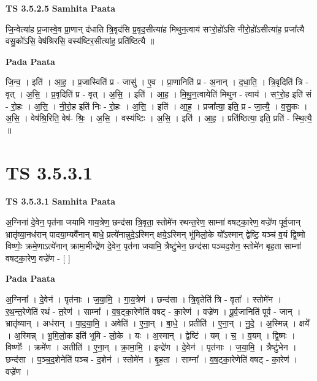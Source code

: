 \documentclass[17pt]{extarticle}
\begin{document}
\textbf{TS 3.5.2.5 } \newline
\textbf{Samhita Paata} \newline

जि॒न्वेत्या॑ह प्र॒जास्वे॒व प्रा॒णान् द॑धाति त्रि॒वृद॑सि प्र॒वृद॒सीत्या॑ह मिथुन॒त्वाय॑ सꣳरो॒हो॑ऽसि नीरो॒हो॑ऽसीत्या॑ह॒ प्रजा᳚त्यै वसु॒को॑ऽसि॒ वेष॑श्रिरसि॒ वस्य॑ष्टिर॒सीत्या॑ह॒ प्रति॑ष्ठित्यै ॥ \newline

\textbf{Pada Paata} \newline

जि॒न्व॒ । इति॑ । आ॒ह॒ । प्र॒जास्विति॑ प्र - जासु॑ । ए॒व । प्रा॒णानिति॑ प्र - अ॒नान् । द॒धा॒ति॒ । त्रि॒वृदिति॑ त्रि - वृत् । अ॒सि॒ । प्र॒वृदिति॑ प्र - वृत् । अ॒सि॒ । इति॑ । आ॒ह॒ । मि॒थु॒न॒त्वायेति॑ मिथुन - त्वाय॑ । सꣳ॒॒रो॒ह इति॑ सं - रो॒हः । अ॒सि॒ । नी॒रो॒ह इति॑ निः - रो॒हः । अ॒सि॒ । इति॑ । आ॒ह॒ । प्रजा᳚त्या॒ इति॒ प्र - जा॒त्यै॒ । व॒सु॒कः । अ॒सि॒ । वेष॑श्रि॒रिति॒ वेष॑- श्रिः॒ । अ॒सि॒ । वस्य॑ष्टिः । अ॒सि॒ । इति॑ । आ॒ह॒ । प्रति॑ष्ठित्या॒ इति॒ प्रति॑ - स्थि॒त्यै॒ ॥  \newline





\section{ TS 3.5.3.1 }

\textbf{TS 3.5.3.1 } \newline
\textbf{Samhita Paata} \newline

अ॒ग्निना॑ दे॒वेन॒ पृत॑ना जयामि गाय॒त्रेण॒ छन्द॑सा त्रि॒वृता॒ स्तोमे॑न रथन्त॒रेण॒ साम्ना॑ वषट्का॒रेण॒ वज्रे॑ण पूर्व॒जान् भ्रातृ॑व्या॒नध॑रान् पादया॒म्यवै॑नान् बाधे॒ प्रत्ये॑नान्नुदे॒ऽस्मिन् क्षये॒ऽस्मिन् भू॑मिलो॒के यो᳚ऽस्मान् द्वेष्टि॒ यञ्च॑ व॒यं द्वि॒ष्मो विष्णोः॒ क्रमे॒णाऽत्ये॑नान् क्रामा॒मीन्द्रे॑ण दे॒वेन॒ पृत॑ना जयामि॒ त्रैष्टु॑भेन॒ छन्द॑सा पञ्चद॒शेन॒ स्तोमे॑न बृह॒ता साम्ना॑ वषट्का॒रेण॒ वज्रे॑ण - [  ] \newline

\textbf{Pada Paata} \newline

अ॒ग्निना᳚ । दे॒वेन॑ । पृत॑नाः । ज॒या॒मि॒ । गा॒य॒त्रेण॑ । छन्द॑सा । त्रि॒वृतेति॑ त्रि - वृता᳚ । स्तोमे॑न । र॒थ॒न्त॒रेणेति॑ रथं - त॒रेण॑ । साम्ना᳚ । व॒ष॒ट्का॒रेणेति॑ वषट् - का॒रेण॑ । वज्रे॑ण । पू॒र्व॒जानिति॑ पूर्व - जान् । भ्रातृ॑व्यान् । अध॑रान् । पा॒द॒या॒मि॒ । अवेति॑ । ए॒ना॒न् । बा॒धे॒ । प्रतीति॑ । ए॒ना॒न् । नु॒दे॒ । अ॒स्मिन्न् । क्षये᳚ । अ॒स्मिन्न् । भू॒मि॒लो॒क इति॑ भूमि - लो॒के । यः । अ॒स्मान् । द्वेष्टि॑ । यम् । च॒ । व॒यम् । द्वि॒ष्मः । विष्णोः᳚ । क्रमे॑ण । अतीति॑ । ए॒ना॒न् । क्रा॒मा॒मि॒ । इन्द्रे॑ण । दे॒वेन॑ । पृत॑नाः । ज॒या॒मि॒ । त्रैष्टु॑भेन । छन्द॑सा । प॒ञ्च॒द॒शेनेति॑ पञ्च - द॒शेन॑ । स्तोमे॑न । बृ॒ह॒ता । साम्ना᳚ । व॒ष॒ट्का॒रेणेति॑ वषट् - का॒रेण॑ । वज्रे॑ण ।  \newline
\end{document}
